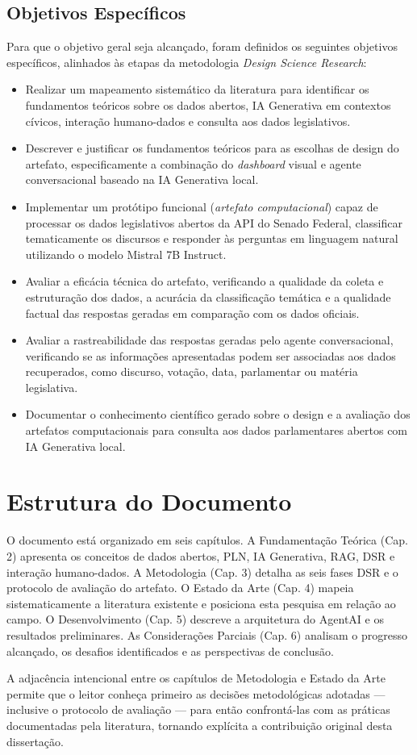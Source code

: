 \subsection{Objetivos Específicos}
Para que o objetivo geral seja alcançado, foram definidos os seguintes objetivos específicos, alinhados às etapas da metodologia \textit{Design Science Research}:

\begin{itemize}
\item Realizar um mapeamento sistemático da literatura para identificar os fundamentos teóricos sobre os dados abertos, IA Generativa em contextos cívicos, interação humano-dados e consulta aos dados legislativos.
\item Descrever e justificar os fundamentos teóricos para as escolhas de design do artefato, especificamente a combinação do \textit{dashboard} visual e agente conversacional baseado na IA Generativa local.
\item Implementar um protótipo funcional (\textit{artefato computacional}) capaz de processar os dados legislativos abertos da API do Senado Federal, classificar tematicamente os discursos e responder às perguntas em linguagem natural utilizando o modelo Mistral 7B Instruct.
\item Avaliar a eficácia técnica do artefato, verificando a qualidade da coleta e estruturação dos dados, a acurácia da classificação temática e a qualidade factual das respostas geradas em comparação com os dados oficiais.
\item Avaliar a rastreabilidade das respostas geradas pelo agente conversacional, verificando se as informações apresentadas podem ser associadas aos dados recuperados, como discurso, votação, data, parlamentar ou matéria legislativa.
\item Documentar o conhecimento científico gerado sobre o design e a avaliação dos artefatos computacionais para consulta aos dados parlamentares abertos com IA Generativa local.
\end{itemize}

\section{Estrutura do Documento}

O documento está organizado em seis capítulos. A Fundamentação Teórica (Cap. 2) apresenta os conceitos de dados abertos, PLN, IA Generativa, RAG, DSR e interação humano-dados. A Metodologia (Cap. 3) detalha as seis fases DSR e o protocolo de avaliação do artefato. O Estado da Arte (Cap. 4) mapeia sistematicamente a literatura existente e posiciona esta pesquisa em relação ao campo. O Desenvolvimento (Cap. 5) descreve a arquitetura do AgentAI e os resultados preliminares. As Considerações Parciais (Cap. 6) analisam o progresso alcançado, os desafios identificados e as perspectivas de conclusão.

A adjacência intencional entre os capítulos de Metodologia e Estado da Arte permite que o leitor conheça primeiro as decisões metodológicas adotadas — inclusive o protocolo de avaliação — para então confrontá-las com as práticas documentadas pela literatura, tornando explícita a contribuição original desta dissertação.

